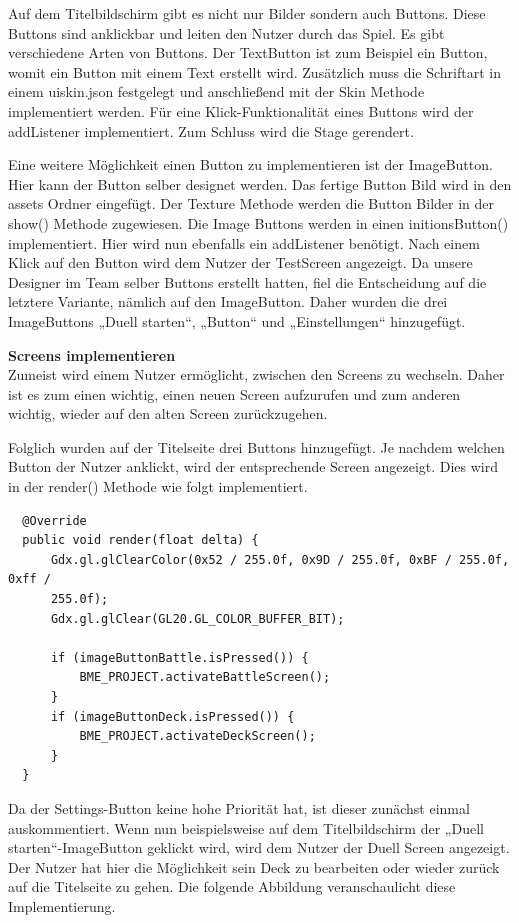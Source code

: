 Auf dem Titelbildschirm gibt es nicht nur Bilder sondern auch Buttons. Diese Buttons sind anklickbar und leiten den Nutzer durch das Spiel.
Es gibt verschiedene Arten von Buttons. Der TextButton ist zum Beispiel ein Button, womit ein Button mit einem Text erstellt wird. Zusätzlich muss die Schriftart in einem uiskin.json festgelegt und anschließend mit der Skin Methode implementiert werden. 
Für eine Klick-Funktionalität eines Buttons wird der addListener implementiert. Zum Schluss wird die Stage gerendert. 

Eine weitere Möglichkeit einen Button zu implementieren ist der ImageButton. Hier kann der Button selber designet werden. Das fertige Button Bild wird in den assets Ordner eingefügt. Der Texture Methode werden die Button Bilder in der show() Methode zugewiesen. Die Image Buttons werden in einen initionsButton() implementiert. Hier wird nun ebenfalls ein addListener benötigt. Nach einem Klick auf den Button wird dem Nutzer der TestScreen angezeigt. Da unsere Designer im Team selber Buttons erstellt hatten, fiel die Entscheidung auf die letztere Variante, nämlich auf den ImageButton. Daher wurden die drei ImageButtons „Duell starten“, „Button“ und „Einstellungen“ hinzugefügt. 

\textbf{Screens implementieren} \\
Zumeist wird einem Nutzer ermöglicht, zwischen den Screens zu wechseln. Daher ist es zum einen wichtig, einen neuen Screen aufzurufen und zum anderen wichtig, wieder auf den alten Screen zurückzugehen.
  
Folglich wurden auf der Titelseite drei Buttons hinzugefügt.
Je nachdem welchen Button der Nutzer anklickt, wird der entsprechende Screen angezeigt. Dies wird in der render() Methode wie folgt implementiert. 

\begin{lstlisting}
  @Override
  public void render(float delta) {
      Gdx.gl.glClearColor(0x52 / 255.0f, 0x9D / 255.0f, 0xBF / 255.0f, 0xff / 
      255.0f);
      Gdx.gl.glClear(GL20.GL_COLOR_BUFFER_BIT);

      if (imageButtonBattle.isPressed()) {
          BME_PROJECT.activateBattleScreen();
      }
      if (imageButtonDeck.isPressed()) {
          BME_PROJECT.activateDeckScreen();
      }
  }
\end{lstlisting}

Da der Settings-Button keine hohe Priorität hat, ist dieser zunächst einmal auskommentiert.
Wenn nun beispielsweise auf dem Titelbildschirm der „Duell starten“-ImageButton geklickt wird, wird dem Nutzer der Duell Screen angezeigt.
Der Nutzer hat hier die Möglichkeit sein Deck zu bearbeiten oder wieder zurück auf die Titelseite zu gehen. Die folgende Abbildung veranschaulicht diese Implementierung. 

